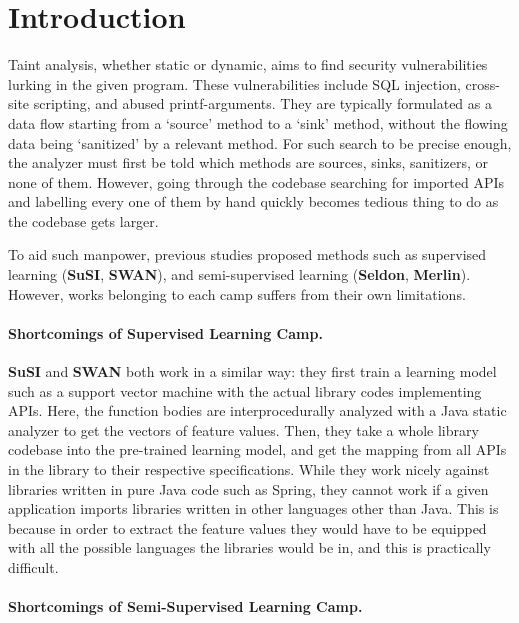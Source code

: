 \section{Introduction}
Taint analysis, whether static or dynamic, aims to find security vulnerabilities lurking
in the given program. These vulnerabilities include SQL injection, cross-site
scripting, and abused printf-arguments. They are typically formulated as a
data flow starting from a `source' method to a `sink' method, without the
flowing data being `sanitized' by a relevant method. For such search to be
precise enough, the analyzer must first be told which methods are sources,
sinks, sanitizers, or none of them. However, going through the codebase
searching for imported APIs and labelling every one of them by hand quickly becomes tedious
thing to do as the codebase gets larger.

To aid such manpower, previous studies proposed methods such as supervised
learning (\textbf{SuSI}, \textbf{SWAN}), and semi-supervised learning (\textbf{Seldon}, \textbf{Merlin}).
However, works belonging to each camp suffers from their own limitations.

\paragraph{Shortcomings of Supervised Learning Camp.}

\textbf{SuSI} and \textbf{SWAN} both work in a similar way: they first train a learning model
such as a support vector machine with the actual library codes implementing
APIs. Here, the function bodies are interprocedurally analyzed with a Java
static analyzer to get the vectors of feature values. Then, they take a whole
library codebase into the pre-trained learning
model, and get the mapping from all APIs in the library to their respective
specifications. While they work nicely against libraries written in pure Java
code such as Spring, they cannot work if a given application imports libraries
written in other languages other than Java. This is because in order to extract
the feature values they would have to be equipped with all the possible
languages the libraries would be in, and this is practically difficult.


\paragraph{Shortcomings of Semi-Supervised Learning Camp.}

